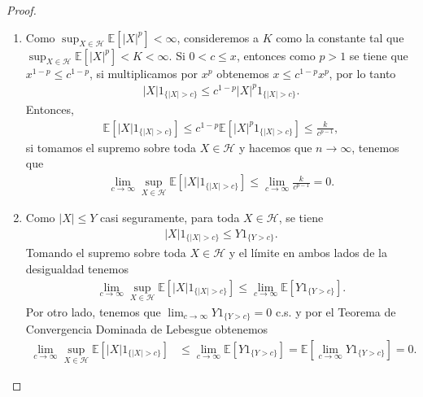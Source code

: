 \begin{proof}
	\begin{enumerate}
	\item Como $\sup_{X \in \mathcal{H}} \mathbb{E}[|X|^p] < \infty$, consideremos a $K$ como la constante tal que $\sup_{X \in \mathcal{H}} \mathbb{E}[|X|^p] < K < \infty$. Si $0 < c \leq x$, entonces como $p > 1$ se tiene que $x^{1-p} \leq c^{1-p}$, si multiplicamos por $x^p$ obtenemos $x \leq c^{1-p}x^p$, por lo tanto
		\begin{align*}
		|X| 1_{\{|X| > c\}} \leq c^{1-p}  |X|^p 1_{\{|X| > c\}}.
		\end{align*}
Entonces,
		\begin{align*}
		\mathbb{E}\left[ |X| 1_{\{|X| > c\}} \right] \leq c^{1-p}  \mathbb{E} \left[ |X|^p 1_{\{|X| > c\}} \right] \leq \frac{k}{c^{p-1}},
		\end{align*}
	si tomamos el supremo sobre toda $X \in \mathcal{H}$ y hacemos que $n \rightarrow \infty$, tenemos que
		\begin{align*}
		\lim_{c \rightarrow \infty} \sup_{X \in \mathcal{H}} \mathbb{E} \left[ |X| 1_{ \{|X| > c\} } \right] \leq \lim_{c \rightarrow \infty} \frac{k}{c^{p-1}} = 0.
		\end{align*}
		
	\item Como $|X| \leq Y$ casi seguramente, para toda $X \in \mathcal{H}$, se tiene
		\begin{align*}
		|X| 1_{ \{|X| > c\} } \leq Y 1_{ \{Y > c\} }.
		\end{align*}
	Tomando el supremo sobre toda $X \in \mathcal{H}$ y el límite en ambos lados de la desigualdad tenemos
		\begin{align*}
		\lim_{c \rightarrow \infty} \sup_{X \in \mathcal{H}} \mathbb{E} \left[ |X| 1_{ \{|X| > c\} } \right] \leq \lim_{c \rightarrow \infty} \mathbb{E}\left[Y 1_{ \{Y > c\} }\right].
		\end{align*}
	Por otro lado, tenemos que $\lim_{c \rightarrow \infty} Y 1_{ \{Y > c\} } = 0$ c.s. y por el Teorema de Convergencia Dominada de Lebesgue obtenemos
		\begin{align*}
		\lim_{c \rightarrow \infty} \sup_{X \in \mathcal{H}} \mathbb{E} \left[ |X| 1_{ \{|X| > c\} } \right] & \leq \lim_{c \rightarrow \infty} \mathbb{E} \left[ Y 1_{ \{Y > c\} } \right] = \mathbb{E} \left[ \lim_{c \rightarrow \infty} Y 1_{ \{Y > c\} } \right] = 0.
		\end{align*}
	\end{enumerate}
\end{proof}

